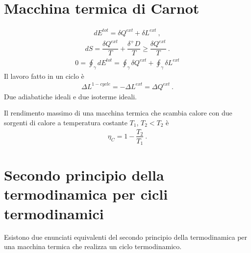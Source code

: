 \documentclass[letterpaper,10pt,italian]{jupyterBook}
\begin{document}
\section{Macchina termica di Carnot}
\label{\detokenize{ch/thermodynamics/heat-engine-carnot:macchina-termica-di-carnot}}\label{\detokenize{ch/thermodynamics/heat-engine-carnot:physics-hs-thermodynamics-heat-engine-carnot}}\label{\detokenize{ch/thermodynamics/heat-engine-carnot::doc}}\begin{equation*}
\begin{split}d E^{tot} = \delta Q^{ext} + \delta L^{ext} \ ,\end{split}
\end{equation*}\begin{equation*}
\begin{split}dS = \dfrac{\delta Q^{ext}}{T} + \dfrac{\delta^+ D}{T} \ge  \dfrac{\delta Q^{ext}}{T} \ .\end{split}
\end{equation*}\begin{equation*}
\begin{split}0 = \oint_{\gamma} d E^{tot} = \oint_{\gamma} \delta Q^{ext} + \oint_{\gamma} \delta L^{ext}\end{split}
\end{equation*}
\sphinxAtStartPar
Il lavoro fatto in un ciclo è
\begin{equation*}
\begin{split}\Delta L^{1-cycle} = - \Delta L^{ext} = \Delta Q^{ext} \ .\end{split}
\end{equation*}
\sphinxAtStartPar
{} Due adiabatiche ideali e due isoterme ideali.

\sphinxAtStartPar
{} Il rendimento massimo di una macchina termica che scambia calore con due sorgenti di calore a temperatura costante \(T_1\), \(T_2 < T_2\) è
\begin{equation*}
\begin{split}\eta_C = 1 - \dfrac{T_2}{T_1} \ .\end{split}
\end{equation*}
\sphinxstepscope


\section{Secondo principio della termodinamica per cicli termodinamici}
\label{\detokenize{ch/thermodynamics/heat-engine-second-principle:secondo-principio-della-termodinamica-per-cicli-termodinamici}}\label{\detokenize{ch/thermodynamics/heat-engine-second-principle:physics-hs-thermodynamics-heat-engine-second-principle}}\label{\detokenize{ch/thermodynamics/heat-engine-second-principle::doc}}
\sphinxAtStartPar
Esistono due enunciati equivalenti del secondo principio della termodinamica per una macchina termica che realizza un ciclo termodinamico.
\end{document}
